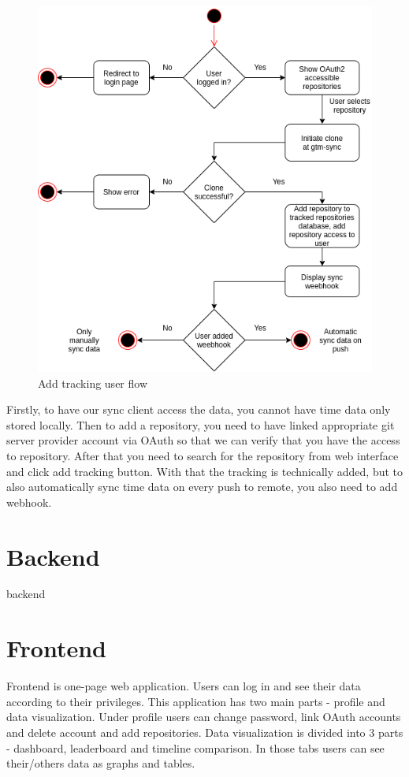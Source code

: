 \begin{figure}[h]
    \includegraphics[width=\textwidth]{figures/add_repo_user_flow}
    \caption{Add tracking user flow}
    \label{fig:add-tracking-user-flow}
\end{figure}

Firstly, to have our sync client access the data, you cannot have time data only stored locally.
Then to add a repository, you need to have linked appropriate git server provider account via OAuth so that we can
verify that you have the access to repository.
After that you need to search for the repository from web interface and click add tracking button.
With that the tracking is technically added, but to also automatically sync time data on every push to remote,
you also need to add webhook.


\section{Backend}\label{sec:backend-content}
backend %

\section{Frontend}\label{sec:frontend-content}
Frontend is one-page web application.
Users can log in and see their data according to their privileges.
This application has two main parts - profile and data visualization.
Under profile users can change password, link OAuth accounts and delete account and add repositories.
Data visualization is divided into 3 parts - dashboard, leaderboard and timeline comparison.
In those tabs users can see their/others data as graphs and tables.

